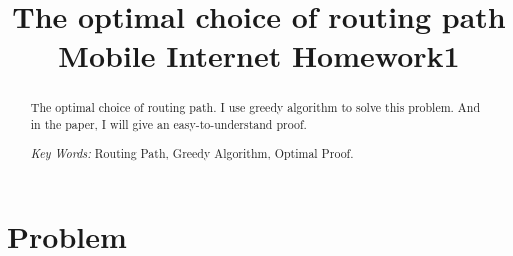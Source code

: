 \documentclass{article}
\title{\textbf{The optimal choice of routing path\\Mobile Internet Homework1}}
\begin{document}
	\maketitle
	
	\begin{abstract}
		The optimal choice of routing path. I use greedy algorithm to solve this problem. And in the paper, I will give an easy-to-understand proof.
		
		
		\textit{Key Words: }Routing Path, Greedy Algorithm, Optimal Proof.
	\end{abstract}
	
	
	\section{Problem}
	
	
\end{document}
